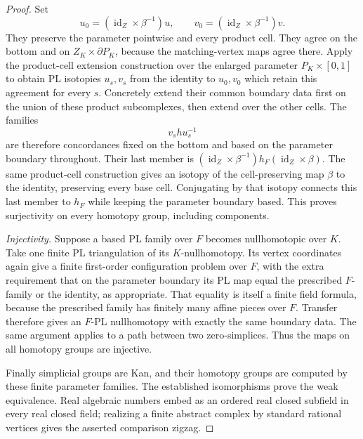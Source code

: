 \begin{proof}
Set
\[
 u_0=(\operatorname{id}_Z\times\beta^{-1})u,\qquad
 v_0=(\operatorname{id}_Z\times\beta^{-1})v.
\]
They preserve the parameter pointwise and every product cell.
They agree on the bottom and on $Z_K\times\partial P_K$,
because the matching-vertex maps agree there. Apply the
product-cell extension construction over the enlarged parameter
$P_K\times[0,1]$ to obtain PL isotopies $u_s,v_s$ from the
identity to $u_0,v_0$ which retain this agreement for every $s$.
Concretely extend their common boundary data first on the union
of these product subcomplexes, then extend over the other cells.
The families
\[
 v_s h u_s^{-1}
\]
are therefore concordances fixed on the bottom and based on
the parameter boundary throughout. Their last member is
$(\operatorname{id}_Z\times\beta^{-1})h_F
(\operatorname{id}_Z\times\beta)$.
The same product-cell construction gives an isotopy of the
cell-preserving map $\beta$ to the identity, preserving every
base cell. Conjugating by that isotopy connects this last member
to $h_F$ while keeping the parameter boundary based. This proves
surjectivity on every homotopy group, including components.

\emph{Injectivity.}
Suppose a based PL family over $F$ becomes nullhomotopic over
$K$. Take one finite PL triangulation of its $K$-nullhomotopy.
Its vertex coordinates again give a finite first-order
configuration problem over $F$, with the extra requirement that
on the parameter boundary its PL map equal the prescribed
$F$-family or the identity, as appropriate. That equality is
itself a finite field formula, because the prescribed family
has finitely many affine pieces over $F$. Transfer therefore
gives an $F$-PL nullhomotopy with exactly the same boundary data.
The same argument applies to a path between two zero-simplices.
Thus the maps on all homotopy groups are injective.

Finally simplicial groups are Kan, and their homotopy groups
are computed by these finite parameter families. The established
isomorphisms prove the weak equivalence. Real algebraic numbers
embed as an ordered real closed subfield in every real closed
field; realizing a finite abstract complex by standard rational
vertices gives the asserted comparison zigzag.
\end{proof}


